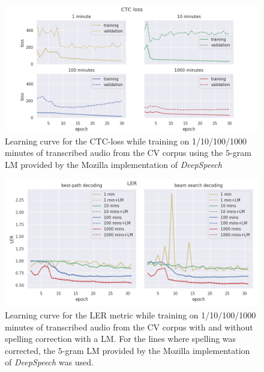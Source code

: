 \begin{figure}[h!]
	\includegraphics[width=\linewidth]{./img/lc_loss_cv.png}
	\caption{Learning curve for the CTC-loss while training on 1/10/100/1000 minutes of transcribed audio from the \ac{CV} corpus using the $5$-gram \ac{LM} provided by the Mozilla implementation of \textit{DeepSpeech}}
	\label{lc_loss_cv}
\end{figure}

\begin{figure}[h!]
	\includegraphics[width=\linewidth]{./img/lc_ler_cv.png}
	\caption{Learning curve for the \ac{LER} metric while training on 1/10/100/1000 minutes of transcribed audio from the \ac{CV} corpus with and without spelling correction with a \ac{LM}. For the lines where spelling was corrected, the $5$-gram \ac{LM} provided by the Mozilla implementation of \textit{DeepSpeech} was used.}
	\label{lc_ler_cv}
\end{figure}

